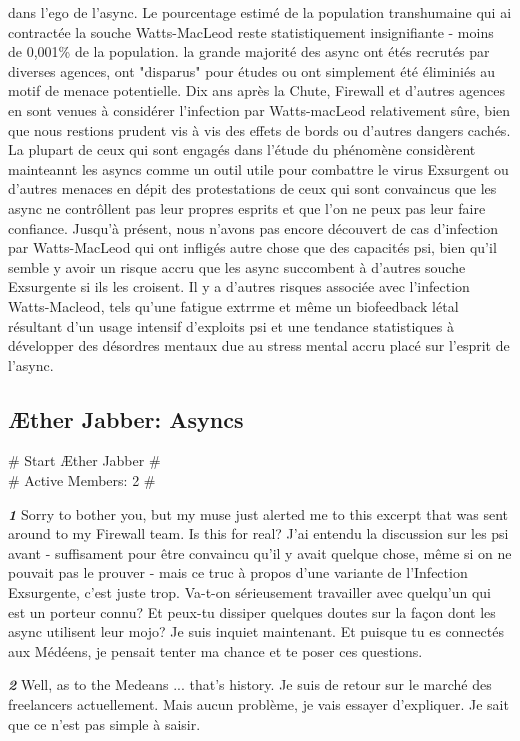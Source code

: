 dans l'ego de l'async. Le pourcentage estimé de la population transhumaine qui ai contractée la souche Watts-MacLeod reste statistiquement insignifiante - moins de 0,001\% de la population. la grande majorité des async ont étés recrutés par diverses agences, ont "disparus" pour études ou ont simplement été éliminiés au motif de menace potentielle. Dix ans après la Chute, Firewall et d'autres agences en sont venues à considérer l'infection par Watts-macLeod relativement sûre, bien que nous restions prudent vis à vis des effets de bords ou d'autres dangers cachés. La plupart de ceux qui sont engagés dans l'étude du phénomène considèrent mainteannt les asyncs comme un outil utile pour combattre le virus Exsurgent ou d'autres menaces en dépit des protestations de ceux qui sont convaincus que les async ne contrôllent pas leur propres esprits et que l'on ne peux pas leur faire confiance. Jusqu'à présent, nous n'avons pas encore découvert de cas d'infection par Watts-MacLeod qui ont infligés autre chose que des capacités psi, bien qu'il semble y avoir un risque accru que les async succombent à d'autres souche Exsurgente si ils les croisent. Il y a d'autres risques associée avec l'infection Watts-Macleod, tels qu'une fatigue extrrme et même un biofeedback létal résultant d'un usage intensif d'exploits psi et une tendance statistiques à développer des désordres mentaux due au stress mental accru placé sur l'esprit de l'async. 

\newpage

\subsection{Æther Jabber: Asyncs} \# Start Æther Jabber \# \\ \# Active Members: 2 \# 

\textbf{\textit{1}} Sorry to bother you, but my muse just alerted me to this excerpt that was sent around to my Firewall team. Is this for real? J'ai entendu la discussion sur les psi avant - suffisament pour être convaincu qu'il y avait quelque chose, même si on ne pouvait pas le prouver - mais ce truc à propos d'une variante de l'Infection Exsurgente, c'est juste trop. Va-t-on sérieusement travailler avec quelqu'un qui est un porteur connu? Et peux-tu dissiper quelques doutes sur la façon dont les async utilisent leur mojo? Je suis inquiet maintenant. Et puisque tu es connectés aux Médéens, je pensait tenter ma chance et te poser ces questions. 

\textbf{\textit{2}} Well, as to the Medeans ... that’s history. Je suis de retour sur le marché des freelancers actuellement. Mais aucun problème, je vais essayer d'expliquer. Je sait que ce n'est pas simple à saisir. 

